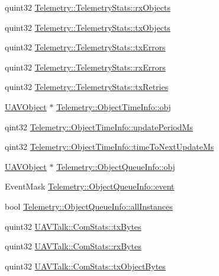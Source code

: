 \begin{DoxyCompactItemize}
\item 
quint32 \hyperlink{group___u_a_v_talk_plugin_gacd544f271fc6ee0f5eb72dc101a23c21}{Telemetry\-::\-Telemetry\-Stats\-::rx\-Objects}
\item 
quint32 \hyperlink{group___u_a_v_talk_plugin_gaa7970a8185efea335e5cbe734739eca9}{Telemetry\-::\-Telemetry\-Stats\-::tx\-Objects}
\item 
quint32 \hyperlink{group___u_a_v_talk_plugin_gad6930d8f0e5a3c2e251c9600d1264c1a}{Telemetry\-::\-Telemetry\-Stats\-::tx\-Errors}
\item 
quint32 \hyperlink{group___u_a_v_talk_plugin_gaf07e5e11a7f3b4c277a26fa5dba7d3fa}{Telemetry\-::\-Telemetry\-Stats\-::rx\-Errors}
\item 
quint32 \hyperlink{group___u_a_v_talk_plugin_ga071780b1d6a06aa36a41efaa190e97ec}{Telemetry\-::\-Telemetry\-Stats\-::tx\-Retries}
\item 
\hyperlink{class_u_a_v_object}{U\-A\-V\-Object} $\ast$ \hyperlink{group___u_a_v_talk_plugin_ga5dc98fd0fc9c63da03a2468969adb919}{Telemetry\-::\-Object\-Time\-Info\-::obj}
\item 
qint32 \hyperlink{group___u_a_v_talk_plugin_ga63538585df200e147d34a4a929976b4d}{Telemetry\-::\-Object\-Time\-Info\-::update\-Period\-Ms}
\item 
qint32 \hyperlink{group___u_a_v_talk_plugin_gad3f8bd7cd7ca82748573626dde1055af}{Telemetry\-::\-Object\-Time\-Info\-::time\-To\-Next\-Update\-Ms}
\item 
\hyperlink{class_u_a_v_object}{U\-A\-V\-Object} $\ast$ \hyperlink{group___u_a_v_talk_plugin_ga467e2ec75abb2e4535cac1d8cc872692}{Telemetry\-::\-Object\-Queue\-Info\-::obj}
\item 
Event\-Mask \hyperlink{group___u_a_v_talk_plugin_ga6cc8fb5745c2e3cc2a6e0e4512542d7c}{Telemetry\-::\-Object\-Queue\-Info\-::event}
\item 
bool \hyperlink{group___u_a_v_talk_plugin_gaf8816b148dce6b50838c9e84272a1d04}{Telemetry\-::\-Object\-Queue\-Info\-::all\-Instances}
\item 
quint32 \hyperlink{group___u_a_v_talk_plugin_ga6ab32543081346e61bdc67874617d3e1}{U\-A\-V\-Talk\-::\-Com\-Stats\-::tx\-Bytes}
\item 
quint32 \hyperlink{group___u_a_v_talk_plugin_ga93a6f8b7f60333a7e7afb70085ca7efd}{U\-A\-V\-Talk\-::\-Com\-Stats\-::rx\-Bytes}
\item 
quint32 \hyperlink{group___u_a_v_talk_plugin_gaf811665cd1c815ac65764deff354ba6c}{U\-A\-V\-Talk\-::\-Com\-Stats\-::tx\-Object\-Bytes}
\item 

\end{DoxyCompactItemize}
